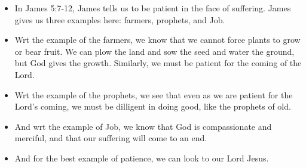 \begin{itemize}
\begin{itemize}
  \end{itemize}
  \item In James 5:7-12, James tells us to be patient in the face of suffering. James gives us three examples here: farmers, prophets, and Job.
  \item Wrt the example of the farmers, we know that we cannot force plants to grow or bear fruit. We can plow the land and sow the seed and water the ground, but God gives the growth. Similarly, we must be patient for the coming of the Lord. 
  \item Wrt the example of the prophets, we see that even as we are patient for the Lord’s coming, we must be dilligent in doing good, like the prophets of old.
  \item And wrt the example of Job, we know that God is compassionate and merciful, and that our suffering will come to an end.
  \item And for the best example of patience, we can look to our Lord Jesus.

\end{itemize}